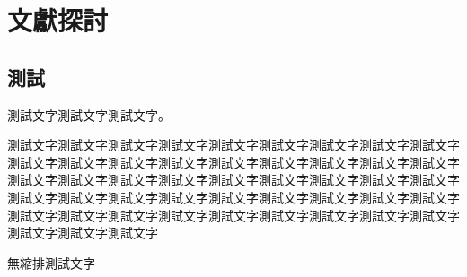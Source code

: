 \chapter{文獻探討}
\label{c:related}

\section{測試}

測試文字測試文字測試文字\cite{test2018,test2019}。

測試文字測試文字測試文字測試文字測試文字測試文字測試文字測試文字測試文字測試文字測試文字測試文字測試文字測試文字測試文字測試文字測試文字測試文字測試文字測試文字測試文字測試文字測試文字測試文字測試文字測試文字測試文字測試文字測試文字測試文字測試文字測試文字測試文字測試文字測試文字測試文字測試文字測試文字測試文字測試文字測試文字測試文字測試文字測試文字測試文字測試文字測試文字測試文字

\noindent
無縮排測試文字


